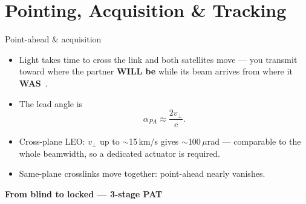 \documentclass{KAIST-slide}
\newcommand{\ai}{\item[\textcolor{islcteal}{\ding{228}}]}      %
\newcommand{\si}{\item[\textcolor{islcorange}{\ding{167}}]}    %
\newcommand{\key}[1]{\textcolor{islcblue}{\textbf{#1}}}        %
\begin{document}
\section{Pointing, Acquisition \& Tracking}

\begin{frame}[allowframebreaks=1.2]{Point-ahead \& acquisition}
    \begin{itemize}
        \ai Light takes time to cross the link and both satellites move --- you transmit toward where the partner \key{WILL be} while its beam arrives from where it \key{WAS}~\cite{kaushal2017optical}.
        \ai The lead angle is
        \begin{equation*}
            \alpha_{PA}\approx \frac{2v_\perp}{c}.
        \end{equation*}
        \si Cross-plane LEO: $v_\perp$ up to $\sim$15\,km/s gives $\sim$100\,$\mu$rad --- comparable to the whole beamwidth, so a dedicated actuator is required.
        \si Same-plane crosslinks move together: point-ahead nearly vanishes.
    \end{itemize}
    \framebreak
    \textbf{From blind to locked --- 3-stage PAT}
    \begin{center}
    \end{center}
\end{frame}
\end{document}
